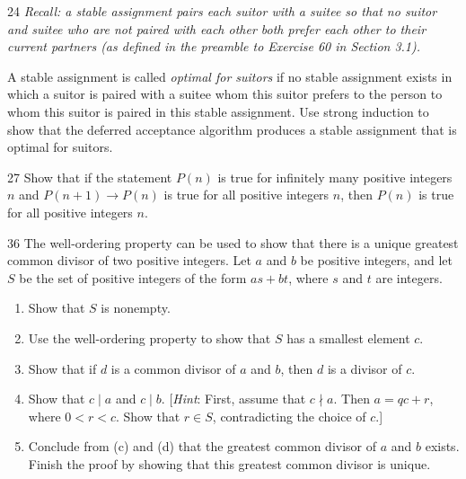 \documentclass[11pt]{article}
\begin{document}
\begin{exercise}{24}
    \textit{Recall: a stable assignment pairs each suitor with a
    suitee so that no suitor and suitee who are not paired with each
    other both prefer each other to their current partners (as
    defined in the preamble to Exercise 60 in Section 3.1).}

    A stable assignment is called \emph{optimal for suitors} if no
    stable assignment exists in which a suitor is paired with a
    suitee whom this suitor prefers to the person to whom this suitor
    is paired in this stable assignment. Use strong induction to show
    that the deferred acceptance algorithm produces a stable
    assignment that is optimal for suitors.
\end{exercise}

\begin{exercise}{27}
    Show that if the statement $P(n)$ is true for infinitely many
    positive integers $n$ and $P(n+1) \to P(n)$ is true for all
    positive integers $n$, then $P(n)$ is true for all positive
    integers $n$.
\end{exercise}

\begin{exercise}{36}
    The well-ordering property can be used to show that there is a
    unique greatest common divisor of two positive integers. Let $a$
    and $b$ be positive integers, and let $S$ be the set of positive
    integers of the form $as + bt$, where $s$ and $t$ are integers.
    \begin{enumerate}[label=(\alph*)]
        \item Show that $S$ is nonempty.
        \item Use the well-ordering property to show that $S$ has a
        smallest element $c$.
        \item Show that if $d$ is a common divisor of $a$ and $b$,
        then $d$ is a divisor of $c$.
        \item Show that $c \mid a$ and $c \mid b$.
        [\emph{Hint}: First, assume that $c \nmid a$. Then
        $a = qc + r$, where $0 < r < c$. Show that $r \in S$,
        contradicting the choice of $c$.]
        \item Conclude from (c) and (d) that the greatest common
        divisor of $a$ and $b$ exists. Finish the proof by showing
        that this greatest common divisor is unique.
    \end{enumerate}
\end{exercise}
\end{document}
